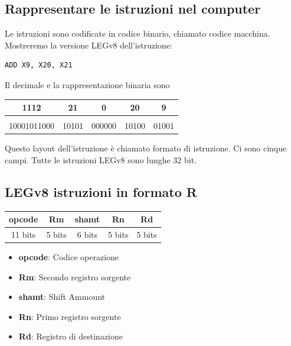 \documentclass[12pt,a4paper]{article}
\begin{document}
\subsection{Rappresentare le istruzioni nel computer}
Le istruzioni sono codificate in codice binario, chiamato codice macchina. \\
Mostreremo la versione LEGv8 dell'istruzione:
\begin{center}
\begin{minipage}{.4\linewidth}
\begin{verbatim}
ADD X9, X20, X21
\end{verbatim}
\end{minipage}
\end{center}
Il decimale e la rappresentazione binaria sono
\begin{center}\begin{tabular}{ccccc}
\hline
\multicolumn{1}{|c|}{1112} & \multicolumn{1}{c|}{21} & \multicolumn{1}{c|}{0} & \multicolumn{1}{c|}{20} & \multicolumn{1}{c|}{9} \\ \hline
                       &                       &                       &                       &                       \\ \hline
\multicolumn{1}{|c|}{10001011000} & \multicolumn{1}{c|}{10101} & \multicolumn{1}{c|}{000000} & \multicolumn{1}{c|}{10100} & \multicolumn{1}{c|}{01001} \\ \hline
\end{tabular}\end{center}
Questo layout dell'istruzione è chiamato formato di istruzione. Ci sono cinque campi. Tutte le istruzioni LEGv8 sono lunghe 32 bit.

\subsection{LEGv8 istruzioni in formato R}
\Sep
\begin{center}\begin{tabular}{ccccc}
\hline
\multicolumn{1}{|c|}{opcode} & \multicolumn{1}{c|}{Rm} & \multicolumn{1}{c|}{shamt} & \multicolumn{1}{c|}{Rn} & \multicolumn{1}{c|}{Rd} \\ \hline
11 bits & 5 bits & 6 bits & 5 bits & 5 bits                     
\end{tabular}\end{center}
\begin{itemize}
\item \textbf{opcode}: Codice operazione
\item \textbf{Rm}: Secondo registro sorgente
\item \textbf{shamt}: Shift Ammount
\item \textbf{Rn}: Primo registro sorgente
\item \textbf{Rd}: Registro di destinazione
\end{itemize}
\end{document}
